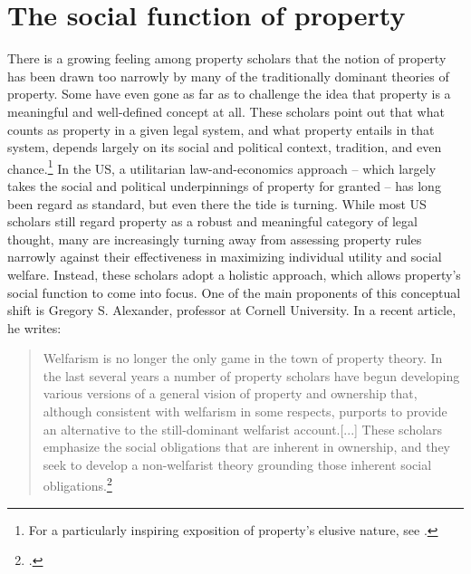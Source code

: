 \documentclass[12pt,a4paper]{book} %
\begin{document}
\section{The social function of property}

There is a growing feeling among property scholars that the notion of property has been drawn too narrowly by many of the traditionally dominant theories of property. Some have even gone as far as to challenge the idea that property is a meaningful and well-defined concept at all. These scholars point out that what counts as property in a given legal system, and what property entails in that system, depends largely on its social and political context, tradition, and even chance.\footnote{For a particularly inspiring exposition of property's elusive nature, see \cite{gray91}.} In the US, a utilitarian law-and-economics approach -- which largely takes the social and political underpinnings of property for granted -- has long been regard as standard, but even there the tide is turning. While most US scholars still regard property as a robust and meaningful category of legal thought, many are increasingly turning away from assessing property rules narrowly against their effectiveness in maximizing individual utility and social welfare. Instead, these scholars adopt a holistic approach, which allows property's social function to come into focus. One of the main proponents of this conceptual shift is Gregory S. Alexander, professor at Cornell University. In a recent article, he writes:

\begin{quote} Welfarism is no longer the only game in the town of property theory. In the last several years a number of property scholars have begun developing various versions of a general vision of property and ownership that, although consistent with welfarism in some respects, purports to provide an alternative to the still-dominant welfarist account.[...] These scholars emphasize the social obligations that are inherent in ownership, and they seek to develop a non-welfarist theory grounding those inherent social obligations.\footcite[1017]{alexander11}
\end{quote}
\end{document}
